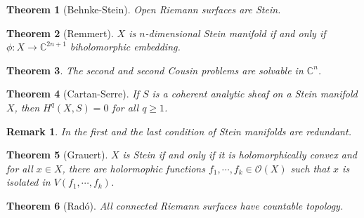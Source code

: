 \documentclass{article}
\newtheorem{theorem}{Theorem} [section]
\newtheorem{remark}{Remark}[section]
\newcommand{\C}[0]{\mathbb{C}}
\newcommand{\Ouv}[0]{\mathcal{O}}
\begin{document}
    \begin{theorem}[Behnke-Stein]
      Open Riemann surfaces are Stein.
    \end{theorem}
    \begin{theorem}[Remmert]
       $X$ is $n$-dimensional Stein manifold if and only if $\phi:X\to\C^{2n+1}$ biholomorphic embedding.
    \end{theorem}
    \begin{theorem}
      The second and second Cousin problems are solvable in $\C^n$.
    \end{theorem}
    \begin{theorem}[Cartan-Serre]
      If $S$ is a coherent analytic sheaf on a Stein manifold $X$, then $H^q(X,S)=0$ for all $q\geq1$.
    \end{theorem}
    \begin{remark}
      In the first and the last condition of Stein manifolds are redundant. 
    \end{remark}
    \begin{theorem}[Grauert]
      \label{theorem_grauert_stein}
      $X$ is Stein if and only if it is holomorphically convex and for all $x\in X$, there are holormophic functions $f_1,\cdots,f_k\in\Ouv(X)$ such that $x$ is isolated in $V(f_1,\cdots,f_k)$.
    \end{theorem}
    \begin{theorem}[Radó]
      All connected Riemann surfaces have countable topology.
    \end{theorem}
\end{document}

